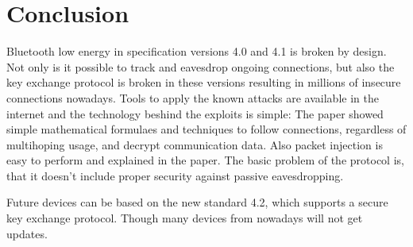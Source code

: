 \documentclass[conference]{IEEEtran}
\begin{document}



\section{Conclusion}

Bluetooth low energy in specification versions 4.0 and 4.1 is broken by design. Not only is it possible to track and eavesdrop ongoing connections, but also the key exchange protocol is broken in these versions resulting in millions of insecure connections nowadays. Tools to apply the known attacks are available in the internet and the technology beshind the exploits is simple: The paper showed simple mathematical formulaes and techniques to follow connections, regardless of multihoping usage, and decrypt communication data. Also packet injection is easy to perform and explained in the paper. The basic problem of the protocol is, that it doesn't include proper security against passive eavesdropping.

Future devices can be based on the new standard 4.2, which supports a secure key exchange protocol. Though many devices from nowadays will not get updates.



%
\end{document}
